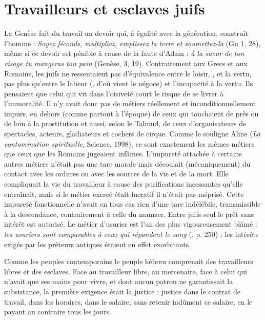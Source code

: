 

\chapter{Travailleurs et esclaves juifs}

 La Genèse fait du travail un devoir qui, à égalité avec la génération, construit l'homme : {\emph{Soyez féconds, multipliez, emplissez la terre et soumettez-la}} (Gn 1, 28), même si ce devoir est pénible à cause de la faute d'Adam : {\emph{à la sueur de ton visage tu mangeras ton pain}} (Genèse, 3, 19). Contrairement aux Grecs et aux Romains, les juifs ne ressentaient pas d'équivalence entre le loisir, {}, et la vertu, pas plus qu'entre le labeur ({}, d'où vient le négoce) et l'incapacité à la vertu. Ils pensaient que celui qui vit dans l'oisiveté court le risque de se livrer à l'immoralité. Il n'y avait donc pas de métiers réellement et inconditionnellement impurs, en dehors (comme partout à l'époque) de ceux qui touchaient de près ou de loin à la prostitution et aussi, selon le Talmud, de ceux d'organisateurs de spectacles, acteurs, gladiateurs et cochers de cirque. Comme le souligne Aline  (\emph{La contamination spirituelle}, Science, 1998), ce sont exactement les mêmes métiers que ceux que les Romains jugeaient infâmes. L'impureté attachée à certains autres métiers n'était pas une tare morale mais découlait (mécaniquement) du contact avec les ordures ou avec les sources de la vie et de la mort. Elle compliquait la vie du travailleur à cause des purifications incessantes qu'elle entraînait, mais si le métier exercé était lucratif il n'était pas méprisé. Cette impureté fonctionnelle n'avait en tous cas rien d'une tare indélébile, transmissible à la descendance, contrairement à celle du mamzer. Entre juifs seul le prêt sans intérêt est autorisé. Le métier d'usurier est l'un des plus vigoureusement blâmé : {\emph{les usuriers sont comparables à ceux qui répandent le sang}} (, p. 250) : les intérêts exigés par les prêteurs antiques étaient en effet exorbitants. 

 Comme les peuples contemporains le peuple hébreu comprenait des travailleurs libres et des esclaves. Face au travailleur libre, au mercenaire, face à celui qui n'avait que ses mains pour vivre, et dont aucun patron ne garantissait la subsistance, la première exigence était la justice : justice dans le contrat de travail, dans les horaires, dans le salaire, sans retenir indûment ce salaire, en le payant au contraire tous les jours.

